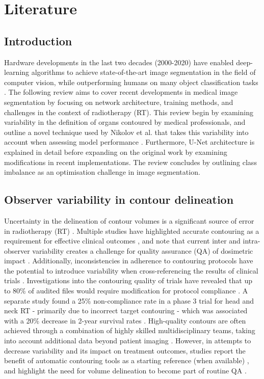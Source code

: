 \chapter{Literature}
\label{ch:literature}

\section{Introduction}
Hardware developments in the last two decades (2000-2020) have enabled
deep-learning algorithms to achieve state-of-the-art image segmentation in the
field of computer vision, while outperforming humans on many object
classification tasks \cite{He2015, Wu2015}. The following review aims
to cover recent developments in medical image segmentation by focusing on
network architecture, training methods, and challenges in the context of
radiotherapy (RT). This review begin by examining variability in the definition
of organs contoured by medical professionals, and outline a novel technique used
by Nikolov et al. that takes this variability into account when assessing model
performance \cite{Nikolov_2018}. Furthermore, U-Net architecture is explained in
detail before expanding on the original work by examining modifications in
recent implementations. The review concludes by outlining class imbalance as an
optimisation challenge in image segmentation.


\section{Observer variability in contour delineation}
Uncertainty in the delineation of contour volumes is a significant source of
error in radiotherapy (RT) \cite{Nikolov_2018}. Multiple studies have
highlighted accurate contouring as a requirement for effective clinical outcomes
\cite{Vinod_2016, Roach_2019, Nemoto_2020}, and note that current inter and
intra-observer variability creates a challenge for quality assurance (QA) of
dosimetric impact \cite{Vinod_2016}. Additionally, inconsistencies in adherence
to contouring protocols have the potential to introduce variability when
cross-referencing the results of clinical trials \cite{Roach_2019}.
Investigations into the contouring quality of trials have revealed that up to
80\% of audited files would require modification for protocol compliance
\cite{Kachnic2013}. A separate study found a 25\% non-compliance rate in a phase
3 trial for head and neck RT - primarily due to incorrect target contouring -
which was associated with a 20\% decrease in 2-year survival rates
\cite{Peters2010}. High-quality contours are often achieved through a
combination of highly skilled multidisciplinary teams, taking into account
additional data beyond patient imaging \cite{Vinod_2016, Roach_2019}. However,
in attempts to decrease variability and its impact on treatment outcomes,
studies report the benefit of automatic contouring tools as a starting reference
(when available) \cite{Vinod_2016}, and highlight the need for volume
delineation to become part of routine QA \cite{Vinod_2016}.

